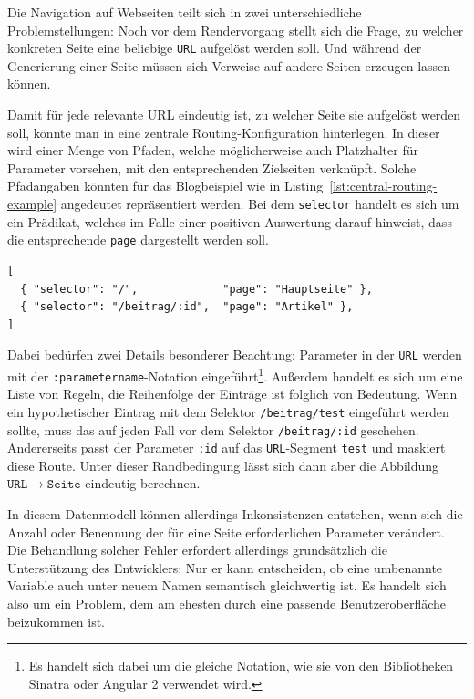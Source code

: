 Die Navigation auf Webseiten teilt sich in zwei unterschiedliche Problemstellungen: Noch vor dem Rendervorgang stellt sich die Frage, zu welcher konkreten Seite eine beliebige \texttt{URL} aufgelöst werden soll. Und während der Generierung einer Seite müssen sich Verweise auf andere Seiten erzeugen lassen können.

Damit für jede relevante URL eindeutig ist, zu welcher Seite sie aufgelöst werden soll, könnte man in \idename{} eine zentrale Routing-Konfiguration hinterlegen. In dieser wird einer Menge von Pfaden, welche möglicherweise auch Platzhalter für Parameter vorsehen, mit den entsprechenden Zielseiten verknüpft. Solche Pfadangaben könnten für das Blogbeispiel wie in Listing~\ref{lst:central-routing-example} angedeutet repräsentiert werden. Bei dem \texttt{selector} handelt es sich um ein Prädikat, welches im Falle einer positiven Auswertung darauf hinweist, dass die entsprechende \texttt{page} dargestellt werden soll.

\begin{lstlisting}[float=h!,caption={Zentrales Routing für das Blog-Beispiel}, label={lst:central-routing-example}]
[
  { "selector": "/",             "page": "Hauptseite" },
  { "selector": "/beitrag/:id",  "page": "Artikel" },
]
\end{lstlisting}

Dabei bedürfen zwei Details besonderer Beachtung: Parameter in der \texttt{URL} werden mit der  \texttt{:parametername}-Notation eingeführt\footnote{Es handelt sich dabei um die gleiche Notation, wie sie von den Bibliotheken Sinatra oder Angular 2 verwendet wird.}. Außerdem handelt es sich um eine Liste von Regeln, die Reihenfolge der Einträge ist folglich von Bedeutung. Wenn ein hypothetischer Eintrag mit dem Selektor \texttt{/beitrag/test} eingeführt werden sollte, muss das auf jeden Fall vor dem Selektor \texttt{/beitrag/:id} geschehen. Andererseits passt der Parameter \texttt{:id} auf das \texttt{URL}-Segment \texttt{test} und maskiert diese Route. Unter dieser Randbedingung lässt sich dann aber die Abbildung $\mathtt{URL} \rightarrow \mathtt{Seite}$ eindeutig berechnen.

In diesem Datenmodell können allerdings Inkonsistenzen entstehen, wenn sich die Anzahl oder Benennung der für eine Seite erforderlichen Parameter verändert. Die Behandlung solcher Fehler erfordert allerdings grundsätzlich die Unterstützung des Entwicklers: Nur er kann entscheiden, ob eine umbenannte Variable auch unter neuem Namen semantisch gleichwertig ist. Es handelt sich also um ein Problem, dem am ehesten durch eine passende Benutzeroberfläche beizukommen ist.

